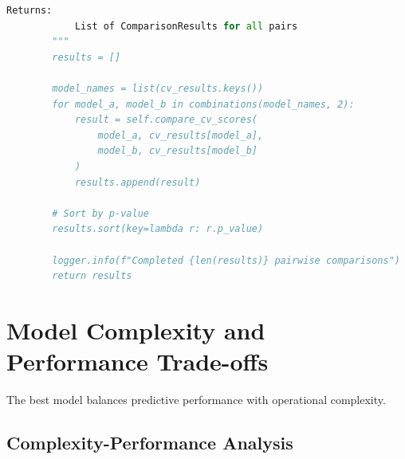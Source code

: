 \begin{lstlisting}[language=Python, caption={Statistical Model Comparison with Multiple Tests}]
        Returns:
            List of ComparisonResults for all pairs
        """
        results = []

        model_names = list(cv_results.keys())
        for model_a, model_b in combinations(model_names, 2):
            result = self.compare_cv_scores(
                model_a, cv_results[model_a],
                model_b, cv_results[model_b]
            )
            results.append(result)

        # Sort by p-value
        results.sort(key=lambda r: r.p_value)

        logger.info(f"Completed {len(results)} pairwise comparisons")
        return results
\end{lstlisting}

\section{Model Complexity and Performance Trade-offs}

The best model balances predictive performance with operational complexity.

\subsection{Complexity-Performance Analysis}


